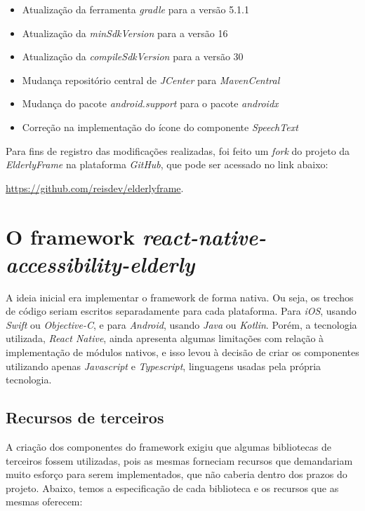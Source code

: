 \documentclass[
	12pt,				    %
	openright,			    %
	oneside,			    %
	a4paper,			    %
    sumario=tradicional,    %
	english,			    %
	brazil,				    %
	]{abntex2}              %
\begin{document}
\begin{itemize}
	\item Atualização da ferramenta \textit{gradle} para a versão 5.1.1
	\item Atualização da \textit{minSdkVersion} para a versão 16
	\item Atualização da \textit{compileSdkVersion} para a versão 30
	\item Mudança repositório central de \textit{JCenter} para \textit{MavenCentral}
	\item Mudança do pacote \textit{android.support} para o pacote \textit{androidx}
	\item Correção na implementação do ícone do componente \textit{SpeechText}
\end{itemize}

Para fins de registro das modificações realizadas, foi feito um \textit{fork} do projeto da \textit{ElderlyFrame} na plataforma \textit{GitHub}, que pode ser acessado no link abaixo: \linebreak

\href{https://github.com/reisdev/elderlyframe/}{https://github.com/reisdev/elderlyframe}.


\section{O framework \textit{react-native-accessibility-elderly}}

\par

A ideia inicial era implementar o framework de forma nativa. Ou seja, os trechos de código seriam escritos separadamente para cada plataforma. Para \textit{iOS}, usando \textit{Swift} ou \textit{Objective-C}, e para \textit{Android}, usando \textit{Java} ou \textit{Kotlin}. Porém, a tecnologia utilizada, \textit{React Native}, ainda apresenta algumas limitações com relação à implementação de módulos nativos, e isso levou à decisão de criar os componentes utilizando apenas \textit{Javascript} e \textit{Typescript}, linguagens usadas pela própria tecnologia.

\subsection{Recursos de terceiros}

A criação dos componentes do framework exigiu que algumas bibliotecas de terceiros fossem utilizadas, pois as mesmas forneciam recursos que demandariam muito esforço para serem implementados, que não caberia dentro dos prazos do projeto. Abaixo, temos a especificação de cada biblioteca e os recursos que as mesmas oferecem:
\end{document}

